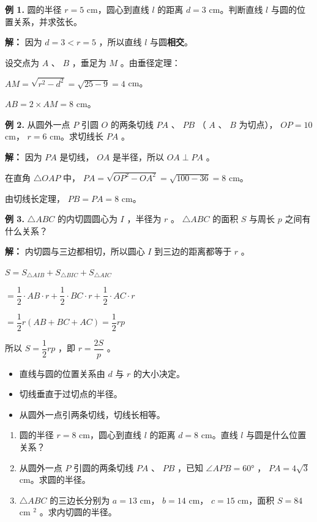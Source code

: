 \begin{workedexamples}


\textbf{例 1.} 圆的半径 $r = 5$ cm，圆心到直线 $l$ 的距离 $d = 3$ cm。判断直线 $l$ 与圆的位置关系，并求弦长。

\textbf{解：}
因为 $d = 3 < r = 5$ ，所以直线 $l$ 与圆\textbf{相交}。

设交点为 $A$ 、 $B$ ，垂足为 $M$ 。由垂径定理：

$AM = \sqrt{r^2 - d^2} = \sqrt{25 - 9} = 4$ cm。

$AB = 2 \times AM = 8$ cm。

\textbf{例 2.} 从圆外一点 $P$ 引圆 $O$ 的两条切线 $PA$ 、 $PB$ （ $A$ 、 $B$ 为切点）， $OP = 10$ cm， $r = 6$ cm。求切线长 $PA$ 。

\textbf{解：}
因为 $PA$ 是切线， $OA$ 是半径，所以 $OA \perp PA$ 。

在直角 $\triangle OAP$ 中， $PA = \sqrt{OP^2 - OA^2} = \sqrt{100 - 36} = 8$ cm。

由切线长定理， $PB = PA = 8$ cm。

\textbf{例 3.} $\triangle ABC$ 的内切圆圆心为 $I$ ，半径为 $r$ 。 $\triangle ABC$ 的面积 $S$ 与周长 $p$ 之间有什么关系？

\textbf{解：}
内切圆与三边都相切，所以圆心 $I$ 到三边的距离都等于 $r$ 。

$S = S_{\triangle AIB} + S_{\triangle BIC} + S_{\triangle AIC}$

$= \dfrac{1}{2} \cdot AB \cdot r + \dfrac{1}{2} \cdot BC \cdot r + \dfrac{1}{2} \cdot AC \cdot r$

$= \dfrac{1}{2}r(AB + BC + AC) = \dfrac{1}{2}rp$

所以 $S = \dfrac{1}{2}rp$ ，即 $r = \dfrac{2S}{p}$ 。

\end{workedexamples}

\begin{keytakeaway}


\begin{itemize}
  \item 直线与圆的位置关系由 $d$ 与 $r$ 的大小决定。
  \item 切线垂直于过切点的半径。
  \item 从圆外一点引两条切线，切线长相等。
\end{itemize}


\end{keytakeaway}

\begin{practice}


\begin{enumerate}
  \item 圆的半径 $r = 8$ cm，圆心到直线 $l$ 的距离 $d = 8$ cm。直线 $l$ 与圆是什么位置关系？
  \item 从圆外一点 $P$ 引圆的两条切线 $PA$ 、 $PB$ ，已知 $\angle APB = 60°$ ， $PA = 4\sqrt{3}$ cm。求圆的半径。
  \item $\triangle ABC$ 的三边长分别为 $a = 13$ cm， $b = 14$ cm， $c = 15$ cm，面积 $S = 84$ cm $^2$ 。求内切圆的半径。
\end{enumerate}


\end{practice}



